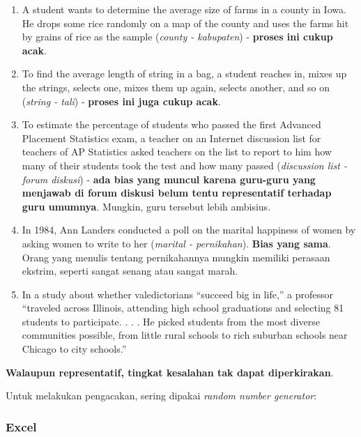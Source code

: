 \documentclass[
  letterpaper,
  DIV=11,
  numbers=noendperiod]{scrreprt}
\providecommand{\tightlist}{%
  \setlength{\itemsep}{0pt}\setlength{\parskip}{0pt}}\usepackage{longtable,booktabs,array}
\begin{document}
\begin{enumerate}
\def\labelenumi{\arabic{enumi}.}
\tightlist
\item
  A student wants to determine the average size of farms in a county in
  Iowa. He drops some rice randomly on a map of the county and uses the
  farms hit by grains of rice as the sample (\emph{county - kabupaten})
  - \textbf{proses ini cukup acak}.
\item
  To find the average length of string in a bag, a student reaches in,
  mixes up the strings, selects one, mixes them up again, selects
  another, and so on (\emph{string - tali}) - \textbf{proses ini juga
  cukup acak}.
\item
  To estimate the percentage of students who passed the first Advanced
  Placement Statistics exam, a teacher on an Internet discussion list
  for teachers of AP Statistics asked teachers on the list to report to
  him how many of their students took the test and how many passed
  (\emph{discussion list - forum diskusi}) - \textbf{ada bias yang
  muncul karena guru-guru yang menjawab di forum diskusi belum tentu
  representatif terhadap guru umumnya}. Mungkin, guru tersebut lebih
  ambisius.
\item
  In 1984, Ann Landers conducted a poll on the marital happiness of
  women by asking women to write to her (\emph{marital - pernikahan}).
  \textbf{Bias yang sama}. Orang yang menulis tentang pernikahannya
  mungkin memiliki perasaan ekstrim, seperti sangat senang atau sangat
  marah.
\item
  In a study about whether valedictorians ``succeed big in life,'' a
  professor ``traveled across Illinois, attending high school
  graduations and selecting 81 students to participate. . . . He picked
  students from the most diverse communities possible, from little rural
  schools to rich suburban schools near Chicago to city schools.''
\end{enumerate}

\textbf{Walaupun representatif, tingkat kesalahan tak dapat
diperkirakan}.

Untuk melakukan pengacakan, sering dipakai \emph{random number
generator}:

\hypertarget{excel}{%
\subsubsection{Excel}\label{excel}}
\end{document}
